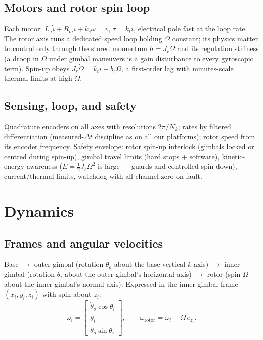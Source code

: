 \documentclass[conference]{IEEEtran}
\begin{document}
\subsection{Motors and rotor spin loop}
Each motor: $L_a\dot i + R_m i + k_e\omega = v$, $\tau = k_t i$, electrical pole fast at the loop rate. The rotor axis runs a dedicated speed loop holding $\Omega$ constant; its physics matter to control only through the stored momentum $h = J_r\Omega$ and its regulation stiffness (a droop in $\Omega$ under gimbal maneuvers is a gain disturbance to every gyroscopic term). Spin-up obeys $J_r\dot\Omega = k_t i - b_r\Omega$, a first-order lag with minutes-scale thermal limits at high $\Omega$.

\subsection{Sensing, loop, and safety}
Quadrature encoders on all axes with resolutions $2\pi/N_k$; rates by filtered differentiation (measured-$\Delta t$ discipline as on all our platforms); rotor speed from its encoder frequency. Safety envelope: rotor spin-up interlock (gimbals locked or centred during spin-up), gimbal travel limits (hard stops + software), kinetic-energy awareness ($E = \tfrac12 J_r\Omega^2$ is large --- guards and controlled spin-down), current/thermal limits, watchdog with all-channel zero on fault.

\section{Dynamics}
\subsection{Frames and angular velocities}
Base $\to$ outer gimbal (rotation $\theta_o$ about the base vertical $k$-axis) $\to$ inner gimbal (rotation $\theta_i$ about the outer gimbal's horizontal axis) $\to$ rotor (spin $\Omega$ about the inner gimbal's normal axis). Expressed in the inner-gimbal frame $(x_i, y_i, z_i)$ with spin about $z_i$:
\begin{equation}
\omega_i = \begin{bmatrix}
\dot\theta_o\cos\theta_i\\ \dot\theta_i\\ \dot\theta_o\sin\theta_i
\end{bmatrix},\qquad
\omega_{\mathrm{rotor}} = \omega_i + \Omega\, e_{z_i}.
\end{equation}
\end{document}

